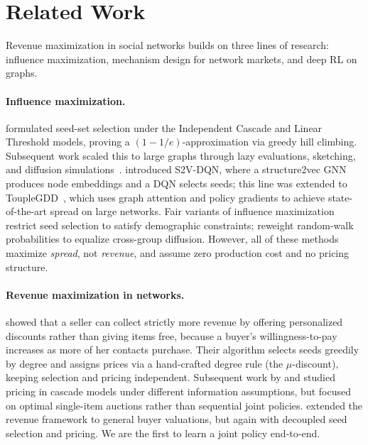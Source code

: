 
\section{Related Work}
\label{sec:related}

Revenue maximization in social networks builds on three lines of research:
influence maximization, mechanism design for network markets, and deep RL on graphs.

\paragraph{Influence maximization.}
\citet{kempe2003maximizing} formulated seed-set selection under the Independent
Cascade and Linear Threshold models, proving a $(1 - 1/e)$-approximation via
greedy hill climbing.
Subsequent work scaled this to large graphs through lazy evaluations, sketching,
and diffusion simulations~\citep{goyal2011celf++,tang2014influence,tang2015influence}.
\citet{dai2017learning} introduced S2V-DQN, where a structure2vec GNN produces
node embeddings and a DQN selects seeds; this line was extended to
ToupleGDD~\citep{touplegdd}, which uses graph attention and policy
gradients to achieve state-of-the-art spread on large networks.
Fair variants of influence maximization~\citep{fish2019gaps,tsang2019group}
restrict seed selection to satisfy demographic constraints;
\citet{khajehnejad2022crosswalk} reweight random-walk probabilities to equalize
cross-group diffusion.
However, all of these methods maximize \emph{spread}, not \emph{revenue}, and
assume zero production cost and no pricing structure.

\paragraph{Revenue maximization in networks.}
\citet{babaei2013revenue} showed that a seller can collect strictly more revenue by
offering personalized discounts rather than giving items free, because a buyer's
willingness-to-pay increases as more of her contacts purchase.
Their algorithm selects seeds greedily by degree and assigns prices via a hand-crafted
degree rule (the $\mu$-discount), keeping selection and pricing independent.
Subsequent work by \citet{singer2012win} and \citet{hartline2008optimal} studied
pricing in cascade models under different information assumptions, but focused on
optimal single-item auctions rather than sequential joint policies.
\citet{kempe2014maximizing} extended the revenue framework to general buyer
valuations, but again with decoupled seed selection and pricing.
We are the first to learn a joint policy end-to-end.

